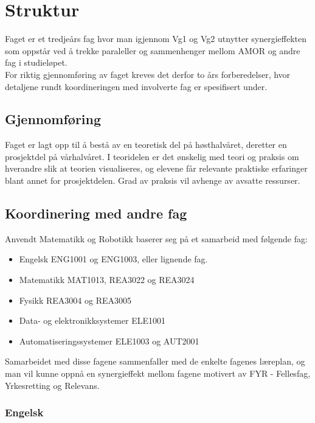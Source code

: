 \section*{Struktur} \label{Sec: Struktur}

	Faget er et tredjeårs fag hvor man igjennom Vg1 og Vg2 utnytter synergieffekten som oppstår ved å trekke paraleller og sammenhenger mellom AMOR og andre fag i studieløpet.\\
	For riktig gjennomføring av faget kreves det derfor to års forberedelser, hvor detaljene rundt koordineringen med involverte fag er spesifisert under.

	\subsection*{Gjennomføring}

	Faget er lagt opp til å bestå av en teoretisk del på høsthalvåret, deretter en prosjektdel på vårhalvåret. I teoridelen er det ønskelig med teori og praksis om hverandre slik at teorien visualiseres, og elevene får relevante praktiske erfaringer blant annet for prosjektdelen. Grad av praksis vil avhenge av avsatte ressurser.



	\subsection*{Koordinering med andre fag}

	Anvendt Matematikk og Robotikk baserer seg på et samarbeid med følgende fag:

	\begin{itemize}
	\item Engelsk ENG1001 og ENG1003, eller lignende fag.
	\item Matematikk MAT1013, REA3022 og REA3024
	\item Fysikk REA3004 og REA3005
	\item Data- og elektronikksystemer ELE1001
	\item Automatiseringssystemer ELE1003 og AUT2001
	\end{itemize}

	Samarbeidet med disse fagene sammenfaller med de enkelte fagenes læreplan,
	og man vil kunne oppnå en synergieffekt mellom fagene motivert av FYR - Fellesfag, Yrkesretting og Relevans.\\


	\subsubsection*{Engelsk}

